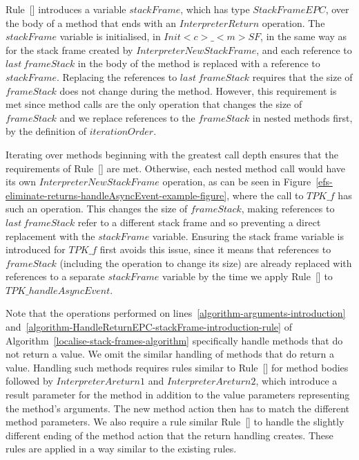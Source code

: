 Rule~[]
introduces a variable $stackFrame$, which has type $StackFrameEPC$,
over the body of a method that ends with an $InterpreterReturn$
operation.
The $stackFrame$ variable is initialised, in $Init{<}c{>}\_{<}m{>}SF$,
in the same way as for the stack frame created by
$InterpreterNewStackFrame$, and each reference to $last~frameStack$ in
the body of the method is replaced with a reference to $stackFrame$.
Replacing the references to $last~frameStack$ requires that the size
of $frameStack$ does not change during the method.
However, this requirement is met since method calls are the only
operation that changes the size of $frameStack$ and we replace
references to the $frameStack$ in nested methods first, by the
definition of $iterationOrder$.

Iterating over methods beginning with the greatest call depth ensures
that the requirements of
Rule~[] are met.
Otherwise, each nested method call would have its own
$InterpreterNewStackFrame$ operation, as can be seen in
Figure~\ref{efs-eliminate-returns-handleAsyncEvent-example-figure},
where the call to $TPK\_f$ has such an operation.
This changes the size of $frameStack$, making references to
$last~frameStack$ refer to a different stack frame and so preventing a
direct replacement with the $stackFrame$ variable.
Ensuring the stack frame variable is introduced for $TPK\_f$ first
avoids this issue, since it means that references to $frameStack$
(including the operation to change its size) are already replaced with
references to a separate $stackFrame$ variable by the time we apply
Rule~[] to
$TPK\_handleAsyncEvent$.

Note that the operations performed on
lines~\ref{algorithm-arguments-introduction}
and~\ref{algorithm-HandleReturnEPC-stackFrame-introduction-rule} of
Algorithm~\ref{localise-stack-frames-algorithm} specifically handle
methods that do not return a value.
We omit the similar handling of methods that do return a value. 
Handling such methods requires rules similar to
Rule~[] for method bodies
followed by $InterpreterAreturn1$ and $InterpreterAreturn2$, which
introduce a result parameter for the method in addition to the value
parameters representing the method's arguments.
The new method action then has to match the different method
parameters.
We also require a rule similar
Rule~[] to
handle the slightly different ending of the method action that the
return handling creates.
These rules are applied in a way similar to the existing rules.

